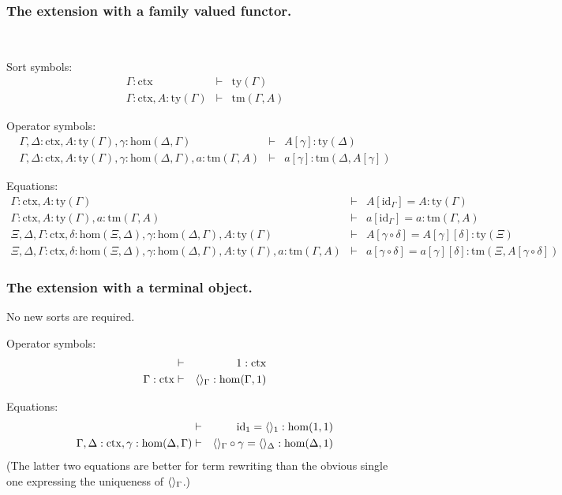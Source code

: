 \documentclass{mscs}
\def\Hom{\mathrm{hom}}
\def\id{\mathrm{id}}
\newcommand{\ctx}{\mathrm{ctx}}
\newcommand{\ty}{\mathrm{ty}}
\newcommand{\tm}{\mathrm{tm}}
\begin{document}
\subsubsection{The extension with a family valued functor.}
\mbox{ }

Sort symbols:
\begin{eqnarray*}
\Gamma : \ctx &\vdash& \ty(\Gamma)\\
\Gamma : \ctx, A:\ty(\Gamma) &\vdash& \tm(\Gamma,A)
\end{eqnarray*}

Operator symbols:
\begin{eqnarray*}
\Gamma,\Delta : \ctx, A:\ty(\Gamma), \gamma : \Hom(\Delta,\Gamma) &\vdash&
A[\gamma] : \ty(\Delta)\\
\Gamma,\Delta : \ctx, A:\ty(\Gamma), \gamma : \Hom(\Delta,\Gamma), a:\tm(\Gamma,A) &\vdash&  a[\gamma] : \tm(\Delta,A[\gamma])
\end{eqnarray*}

Equations:
\begin{eqnarray*}
\Gamma : \ctx, A:\ty(\Gamma) &\vdash& A[\id_\Gamma] = A : \ty(\Gamma)\\
\Gamma : \ctx, A:\ty(\Gamma), a:\tm(\Gamma,A) &\vdash& a[\id_\Gamma] = a : \tm(\Gamma,A)\\
\Xi,\Delta,\Gamma : \ctx, \delta : \Hom(\Xi,\Delta), \gamma : \Hom(\Delta,\Gamma),
A:\ty(\Gamma) &\vdash& A[\gamma\circ\delta] = A[\gamma][\delta]: \ty(\Xi)\\
\Xi,\Delta,\Gamma : \ctx, \delta : \Hom(\Xi,\Delta), \gamma : \Hom(\Delta,\Gamma),
A:\ty(\Gamma), a:\tm(\Gamma,A) &\vdash&
a[\gamma\circ\delta] = a[\gamma][\delta]: \tm(\Xi,A[\gamma\circ\delta])
\end{eqnarray*}

\subsubsection{The extension with a terminal object.}

No new sorts are required.

Operator symbols:
\begin{eqnarray*}
&\vdash& 1 : \ctx\\
\Gamma : \ctx &\vdash& \tuple{}_\Gamma : \Hom(\Gamma,1)
\end{eqnarray*}

Equations:
\begin{eqnarray*}
 &\vdash& \id_1 = \tuple{}_1 : \Hom(1,1)\\
\Gamma,\Delta : \ctx, \gamma : \Hom(\Delta,\Gamma) &\vdash&
\tuple{}_\Gamma\circ\gamma = \tuple{}_\Delta : \Hom(\Delta,1)
\end{eqnarray*}
(The latter two equations are better for term rewriting than the
obvious single one expressing the uniqueness of $\langle  \rangle_\Gamma$.)
\end{document}
